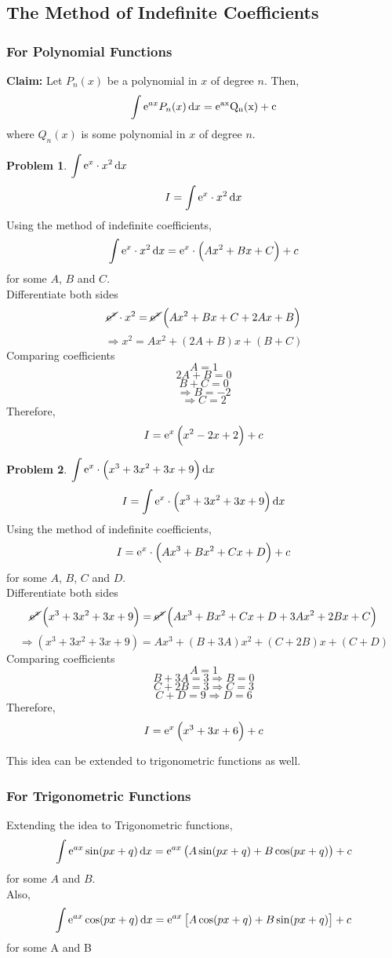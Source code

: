 \documentclass[14]{article}
\theoremstyle{definition}
\newtheorem{prob}{Problem}
\theoremstyle{case}
\begin{document}
\subsection{The Method of Indefinite Coefficients}
\subsubsection{For Polynomial Functions}
\textbf{Claim: } Let $P_n(x)$ be a polynomial in $x$ of degree $n$. Then,
\[\int {\rm e}^{ax} P_n(x) \dif x = \rm {\rm e}^{ax} Q_n(x) + c\]
where $Q_n(x)$ is some polynomial in $x$ of degree $n$. 
\begin{prob}
$\displaystyle \int {\rm e}^x \cdot x^2 \dif x$
\[I = \int {\rm e}^x \cdot x^2 \dif x\]
Using the method of indefinite coefficients,\\
\[\int {\rm e}^x \cdot x^2 \dif x = {\rm e}^x \cdot \left(Ax^2 + Bx + C\right) + c\]
for some $A$, $B$ and $C$.\\
Differentiate both sides\\
\[\cancel{{\rm e}^x} \cdot x^2 = \cancel{{\rm e}^x} \left( Ax^2 + Bx + C + 2Ax + B \right)\]
\[\Rightarrow x^2 = Ax^2 + (2A + B)x + (B+C)\]
Comparing coefficients\\
\[A = 1\]
\[2A + B = 0\]
\[B + C = 0\]
\[\Rightarrow B = -2\]
\[\Rightarrow C = 2\]
Therefore,
\[I = {\rm e}^{x} \left(x^2 -2x + 2 \right) + c\]
\end{prob}
\pagebreak
\begin{prob}
$\displaystyle \int {\rm e}^x \cdot \left(x^3 + 3x^2 + 3x + 9\right) \dif x$
\[I = \int {\rm e}^x \cdot \left(x^3 + 3x^2 + 3x + 9\right) \dif x\]
Using the method of indefinite coefficients,\\
\[I = {\rm e}^x \cdot \left(Ax^3 + Bx^2 + Cx + D\right) + c\]
for some $A$, $B$, $C$ and $D$.\\
Differentiate both sides\\
\[\cancel{{\rm e}^x} \left(x^3 + 3x^2 + 3x + 9\right) = \cancel{{\rm e}^x} \left( Ax^3 + Bx^2 + Cx + D + 3Ax^2 + 2Bx + C \right)\]
\[\Rightarrow \left(x^3 + 3x^2 + 3x + 9\right) = Ax^3 + (B + 3A)x^2 + (C + 2B)x + (C + D)\]
Comparing coefficients\\
\[A = 1\]
\[B + 3A = 3 \Rightarrow B = 0\]
\[C + 2B = 3 \Rightarrow C = 3\]
\[C + D = 9 \Rightarrow D = 6\]
Therefore,
\[I = {\rm e}^{x} \left(x^3 + 3x + 6 \right) + c\]
\end{prob}
This idea can be extended to trigonometric functions as well.
\subsubsection{For Trigonometric Functions}
Extending the idea to Trigonometric functions,
\[\int {\rm e}^{ax} \sin(px+q) \dif x = {\rm e}^{ax} \left( A \sin(px+q) + B \cos(px+q) \right) + c\] for some $A$ and $B$.\\
Also,
\[\int {\rm e}^{ax} \cos(px+q) \dif x= {\rm e}^{ax}\left[ A \cos(px +q) + B \sin(px + q) \right] + c\]
for some A and B
\end{document}
